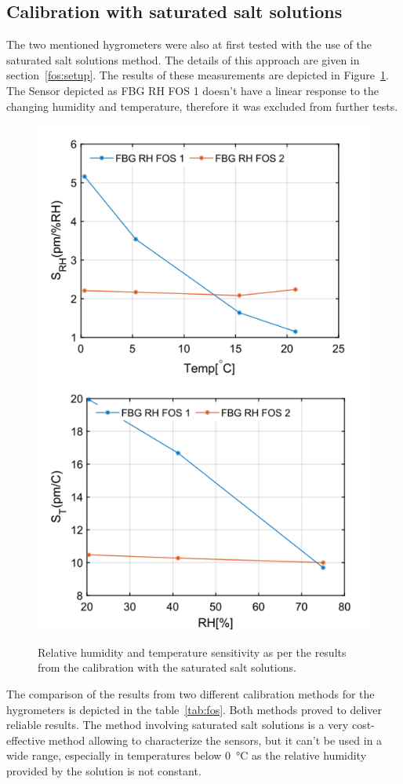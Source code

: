 \subsection{Calibration with saturated salt solutions}
The two mentioned hygrometers were also at first tested with the use of the saturated salt solutions method. The details of this approach are given in section~\ref{fos:setup}. The results of these measurements are depicted in Figure~\ref{fig:fos_salt}. The Sensor depicted as FBG RH FOS 1 doesn't have a linear response to the changing humidity and temperature, therefore it was excluded from further tests. 

\begin{figure}[!h]
\centering
\includegraphics[width=0.49\columnwidth]{Chapter5/images/salt_srh.png}
\includegraphics[width=0.49\columnwidth]{Chapter5/images/salt_st.png}
\caption{Relative humidity and temperature sensitivity as per the results from the calibration with the saturated salt solutions.}
\label{fig:fos_salt}
\end{figure}

The comparison of the results from two different calibration methods for the hygrometers is depicted in the table~\ref{tab:fos}. Both methods proved to deliver reliable results. The method involving saturated salt solutions is a very cost-effective method allowing to characterize the sensors, but it can't be used in a wide range, especially in temperatures below \SI{0}{\celsius} as the relative humidity provided by the solution is not constant. 

